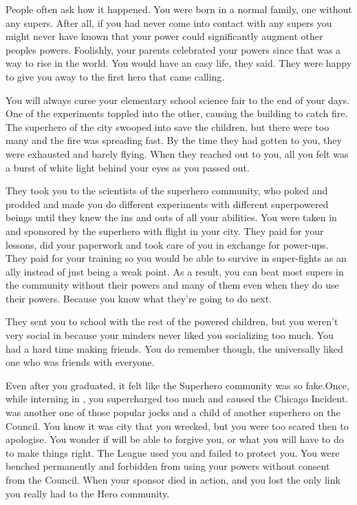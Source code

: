 \documentclass[char]{LRSguildcamp1}
\begin{document}
\name{\cYS{}}

People often ask how it happened. You were born in a normal family, one without any supers. After all, if you had never come into contact with any supers you might never have known that your power could significantly augment other peoples powers. Foolishly, your parents celebrated your powers since that was a way to rise in the world. You would have an easy life, they said. They were happy to give you away to the first hero that came calling. 

You will always curse your elementary school science fair to the end of your days. One of the experiments toppled into the other, causing the building to catch fire. The superhero of the city swooped into save the children, but there were too many and the fire was spreading fast. By the time they had gotten to you, they were exhausted and barely flying. When they reached out to you, all you felt was a burst of white light behind your eyes as you passed out. 

They took you to the scientists of the superhero community, who poked and prodded and made you do different experiments with different superpowered beings until they knew the ins and outs of all your abilities. You were taken in and sponsored by the superhero with flight in your city. They paid for your lessons, did your paperwork and took care of you in exchange for power-ups. They paid for your training so you would be able to survive in super-fights as an ally instead of just being a weak point. As a result, you can beat most supers in the community without their powers and many of them even when they do use their powers. Because you know what they're going to do next.  

They sent you to school with the rest of the powered children, but you weren't very social in \pSuperSchool{} because your minders never liked you socializing too much. You had a hard time making friends. You do remember \cYoungest{} though, the universally liked one who was friends with everyone. 

Even after you graduated, it felt like the Superhero community was so fake.Once, while interning in \pCityO{} , you supercharged \cJuggernaut{} too much and caused the Chicago Incident. \cJuggernaut{} was another one of those popular jocks and a child of another superhero on the Council. You know it was \cOS{} city that you wrecked, but you were too scared then to apologise. You wonder if \cOS{} will be able to forgive you, or what you will have to do to make things right. The League used you and failed to protect you. You were benched permanently and forbidden from using your powers without consent from the Council. When your sponsor died in action, and you lost the only link you really had to the Hero community. 
\end{document}
